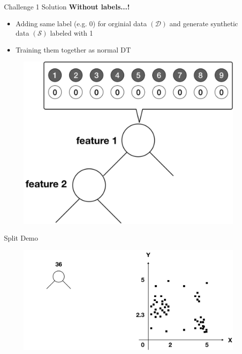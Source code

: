 \documentclass[shortpres]{beamer}
\begin{document}
  \begin{frame}{Challenge 1 Solution}	
    \textbf{Without labels...!} 
    \begin{itemize} 
      \item Adding same label (e.g. 0) for orginial data $(\mathcal{D})$ and generate synthetic data $(\mathcal{S})$ labeled with 1
      \item Training them together as normal DT
    \end{itemize}
      \begin{figure}
        \includegraphics[height=0.5\textheight]{fig/noiserf.pdf} 
      \end{figure}
      \end{frame}
      \begin{frame}{Split Demo}
        \begin{figure}
          \includegraphics[height=0.65\textheight]{fig/split00}
        \end{figure}
      \end{frame}
\end{document}
